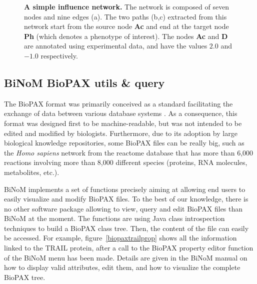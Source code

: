 \documentclass[10pt]{bmc_article}
\newenvironment{bmcformat}{\baselineskip20pt\sloppy\setboolean{publ}{false}}{\baselineskip20pt\sloppy}
\begin{document}
\begin{bmcformat}
\begin{figure}[h]
 \caption{\label{piquantnetworks}  \textbf{A simple influence network.} The 
network is composed of seven nodes and nine edges (a). The two paths (b,c)
extracted from this network start from the source node \textbf{Ac} and end at
the target node \textbf{Ph} (which denotes a phenotype of interest). The nodes
\textbf{Ac} and \textbf{D} are annotated using experimental data, and have the
values $2.0$ and $-1.0$ respectively.}
\end{figure}

\subsection*{BiNoM BioPAX utils \& query}
The BioPAX format was primarily conceived as a standard facilitating the
exchange of data between various database systems \cite{demir2010biopax}. As a
consequence, this format was designed first to be machine-readable, but was not
intended
to be edited and modified by biologists. Furthermore, due to its adoption by
large biological knowledge repositories, some BioPAX files can be really big,
such as the \textit{Homo sapiens} network from the reactome database
\cite{joshi2005reactome} that has more than 6,000 reactions involving more than
8,000 different species (proteins, RNA molecules, metabolites, etc.).

BiNoM implements a set of functions precisely aiming at allowing end users to
easily visualize and modify BioPAX files. To the best of our knowledge, there is
no other software package allowing to view, query and edit BioPAX files than
BiNoM at the moment. The functions are using
Java class introspection techniques to build a BioPAX class tree. Then, the
content of the file can easily be accessed. For example, figure~\ref{biopaxtrailprop} shows
all the information linked to the TRAIL protein, after a call to the
BioPAX property
editor function of the BiNoM menu has been made. Details are given in the BiNoM manual on how
to display valid attributes, edit them, and how to visualize the
complete BioPAX tree.



\end{bmcformat}
\end{document}
